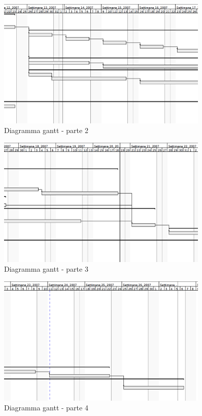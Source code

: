 \begin{figure}[htp, label={gantt2}]
\begin{center}
  \includegraphics[width=0.9\textwidth]{img/gantt2}
  \caption[labelInTOC]{Diagramma gantt - parte 2}
  \label{gantt2}
\end{center}
\end{figure}

\begin{figure}[htp, label={gantt3}]
\begin{center}
  \includegraphics[width=0.9\textwidth]{img/gantt3}
  \caption[labelInTOC]{Diagramma gantt - parte 3}
  \label{gantt3}
\end{center}
\end{figure}

\begin{figure}[htp, label={gantt4}]
\begin{center}
  \includegraphics[width=0.9\textwidth]{img/gantt4}
  \caption[labelInTOC]{Diagramma gantt - parte 4}
  \label{gantt4}
\end{center}
\end{figure}

